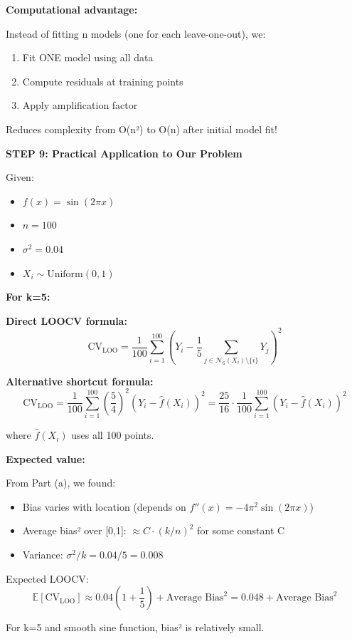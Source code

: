 \documentclass[12pt]{article}
\begin{document}
\begin{solution}
\textbf{Computational advantage:}

Instead of fitting n models (one for each leave-one-out), we:
\begin{enumerate}
    \item Fit ONE model using all data
    \item Compute residuals at training points
    \item Apply amplification factor
\end{enumerate}

Reduces complexity from O(n²) to O(n) after initial model fit!

\textbf{STEP 9: Practical Application to Our Problem}

Given:
\begin{itemize}
    \item $f(x) = \sin(2\pi x)$
    \item $n = 100$
    \item $\sigma^2 = 0.04$
    \item $X_i \sim \text{Uniform}(0,1)$
\end{itemize}

\textbf{For k=5:}

\textbf{Direct LOOCV formula:}
\[
\text{CV}_{\text{LOO}} = \frac{1}{100}\sum_{i=1}^{100} \left(Y_i - \frac{1}{5}\sum_{j \in \mathcal{N}_6(X_i) \setminus \{i\}} Y_j\right)^2
\]

\textbf{Alternative shortcut formula:}
\[
\text{CV}_{\text{LOO}} = \frac{1}{100}\sum_{i=1}^{100} \left(\frac{5}{4}\right)^2(Y_i - \hat{f}(X_i))^2 = \frac{25}{16} \cdot \frac{1}{100}\sum_{i=1}^{100}(Y_i - \hat{f}(X_i))^2
\]

where $\hat{f}(X_i)$ uses all 100 points.

\textbf{Expected value:}

From Part (a), we found:
\begin{itemize}
    \item Bias varies with location (depends on $f''(x) = -4\pi^2\sin(2\pi x)$)
    \item Average bias² over [0,1]: $\approx C \cdot (k/n)^2$ for some constant C
    \item Variance: $\sigma^2/k = 0.04/5 = 0.008$
\end{itemize}

Expected LOOCV:
\[
\mathbb{E}[\text{CV}_{\text{LOO}}] \approx 0.04\left(1 + \frac{1}{5}\right) + \text{Average Bias}^2 = 0.048 + \text{Average Bias}^2
\]

For k=5 and smooth sine function, bias² is relatively small.


\end{solution}
\end{document}
